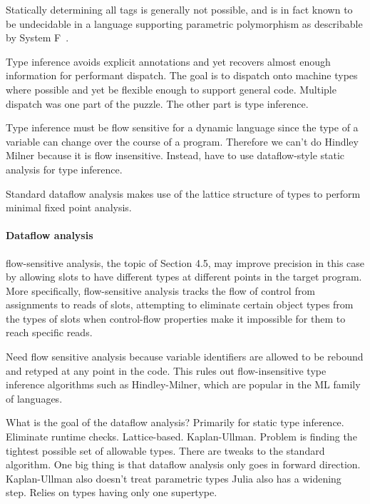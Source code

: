 \documentclass[pldi]{sigplanconf-pldi15}
\begin{document}
Statically determining all tags is generally not possible, and is in fact known
to be undecidable in a language supporting parametric polymorphism as
describable by System F~\cite{Wells1999}.

Type inference avoids explicit annotations and yet recovers almost enough information for performant dispatch. The goal is to dispatch onto machine types where possible and yet be flexible enough to support general code. Multiple dispatch was one part of the puzzle. The other part is type inference.

Type inference must be flow sensitive for a dynamic language since the type of a variable can change over the course of a program. Therefore we can't do Hindley Milner because it is flow insensitive. Instead, have to use dataflow-style static analysis for type inference.

Standard dataflow analysis makes use of the lattice structure of types to perform minimal fixed point analysis.

\paragraph{Dataflow analysis}
 flow-sensitive analysis, the topic of Section 4.5,
may improve precision in this case by allowing slots to have different types at different points in the target program.
More specifically, flow-sensitive analysis tracks the flow of control from assignments to reads of slots, attempting to
eliminate certain object types from the types of slots when control-flow properties make it impossible for them to
reach specific reads.

Need flow sensitive analysis because variable identifiers are allowed to be rebound and retyped at any point in the code. This rules out flow-insensitive type inference algorithms such as Hindley-Milner, which are popular in the ML family of languages.

What is the goal of the dataflow analysis? Primarily for static type inference. Eliminate runtime checks. Lattice-based. Kaplan-Ullman.
Problem is finding the tightest possible set of allowable types.
There are tweaks to the standard algorithm. One big thing is that dataflow analysis only goes in forward direction.
Kaplan-Ullman also doesn't treat parametric types
Julia also has a widening step.
Relies on types having only one supertype.


\end{document}
